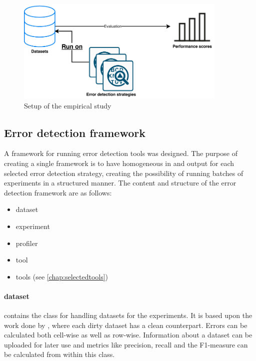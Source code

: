\begin{figure}[h]
    \centering
    \includegraphics[width=0.9\textwidth]{thesis/Figures/Method/PerformanceEstimation-Experiment.pdf}
    \caption{Setup of the empirical study}
    \label{fig:empiricalsetup}
\end{figure}

\subsection{Error detection framework}
A framework for running error detection tools was designed. The purpose of creating a single framework is to have homogeneous in and output for each selected error detection strategy, creating the possibility of running batches of experiments in a structured manner. 
The content and structure of the error detection framework are as follows:
\begin{itemize}[label=]
\item dataset
\item experiment
\item profiler
\item tool
\item tools (see \autoref{chap:selectedtools})
\end{itemize}

\paragraph{dataset} contains the class for handling datasets for the experiments. It is based upon the work done by \cite{Mahdavi2019-zf}, where each dirty dataset has a clean counterpart. Errors can be calculated both cell-wise as well as row-wise. Information about a dataset can be uploaded for later use and metrics like precision, recall and the F1-measure can be calculated from within this class.

